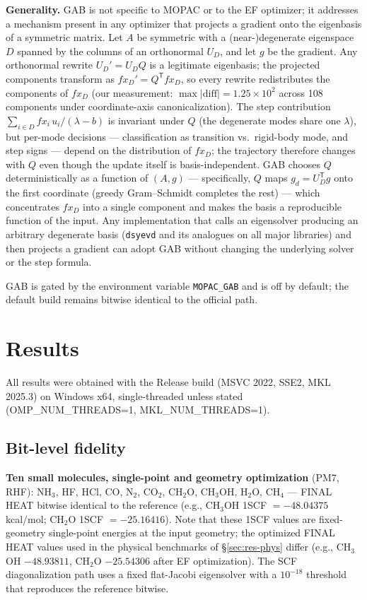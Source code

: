 \documentclass[preprint,12pt]{elsarticle}
\begin{document}
\textbf{Generality.} GAB is not specific to MOPAC or to the EF optimizer; it addresses a mechanism present in any optimizer that projects a gradient onto the eigenbasis of a symmetric matrix. Let $A$ be symmetric with a (near-)degenerate eigenspace $D$ spanned by the columns of an orthonormal $U_D$, and let $g$ be the gradient. Any orthonormal rewrite $U_D' = U_D Q$ is a legitimate eigenbasis; the projected components transform as $fx_D' = Q^{\mathsf T} fx_D$, so every rewrite redistributes the components of $fx_D$ (our measurement: $\max|\mathrm{diff}| = 1.25\times10^2$ across 108 components under coordinate-axis canonicalization). The step contribution $\sum_{i\in D} fx_i\,u_i/(\lambda-b)$ is invariant under $Q$ (the degenerate modes share one $\lambda$), but per-mode decisions --- classification as transition vs.\ rigid-body mode, and step signs --- depend on the distribution of $fx_D$; the trajectory therefore changes with $Q$ even though the update itself is basis-independent. GAB chooses $Q$ deterministically as a function of $(A, g)$ --- specifically, $Q$ maps $g_d = U_D^{\mathsf T}g$ onto the first coordinate (greedy Gram--Schmidt completes the rest) --- which concentrates $fx_D$ into a single component and makes the basis a reproducible function of the input. Any implementation that calls an eigensolver producing an arbitrary degenerate basis (\texttt{dsyevd} and its analogues on all major libraries) and then projects a gradient can adopt GAB without changing the underlying solver or the step formula.

GAB is gated by the environment variable \texttt{MOPAC\_GAB} and is off by default; the default build remains bitwise identical to the official path.

\section{Results}\label{sec:results}

All results were obtained with the Release build (MSVC 2022, SSE2, MKL 2025.3) on Windows x64, single-threaded unless stated (OMP\_NUM\_THREADS=1, MKL\_NUM\_THREADS=1).

\subsection{Bit-level fidelity}\label{sec:res-bit}

\textbf{Ten small molecules, single-point and geometry optimization} (PM7, RHF): NH$_3$, HF, HCl, CO, N$_2$, CO$_2$, CH$_2$O, CH$_3$OH, H$_2$O, CH$_4$ --- FINAL HEAT bitwise identical to the reference (e.g., CH$_3$OH 1SCF $= -48.04375$\,kcal/mol; CH$_2$O 1SCF $= -25.16416$). Note that these 1SCF values are fixed-geometry single-point energies at the input geometry; the optimized FINAL HEAT values used in the physical benchmarks of \S\ref{sec:res-phys} differ (e.g., CH$_3$OH $-48.93811$, CH$_2$O $-25.54306$ after EF optimization). The SCF diagonalization path uses a fixed flat-Jacobi eigensolver with a $10^{-18}$ threshold that reproduces the reference bitwise.
\end{document}
